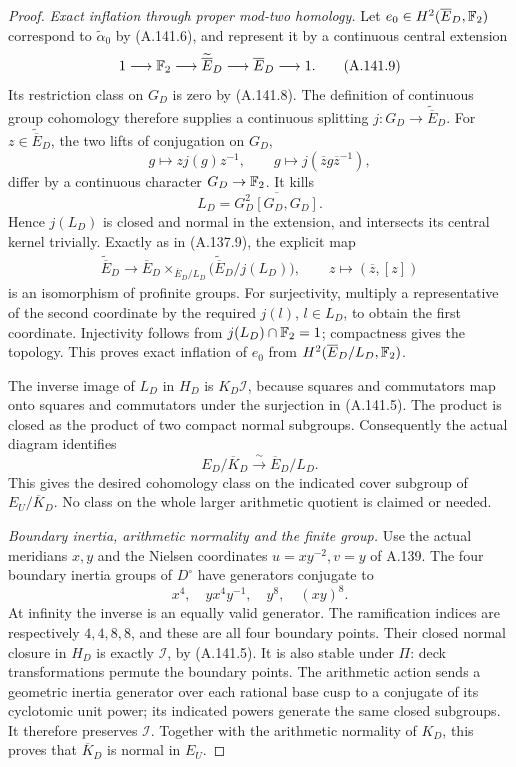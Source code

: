 \begin{proof}
\emph{Exact inflation through proper mod-two homology.}
Let \(e_0\in H^2(\overline E_D,\mathbb F_2)\) correspond to
\(\widetilde\alpha_0\) by (A.141.6), and represent it by a
continuous central extension
\[
 1\longrightarrow\mathbb F_2\longrightarrow
      \widetilde{\overline E}_D\longrightarrow
      \overline E_D\longrightarrow1.
\tag{A.141.9}
\]
Its restriction class on \(G_D\) is zero by (A.141.8).
The definition of continuous group cohomology therefore supplies
a continuous splitting \(j:G_D\to\widetilde{\overline E}_D\).
For \(z\in\widetilde{\overline E}_D\), the two lifts of conjugation
on \(G_D\),
\[
       g\longmapsto zj(g)z^{-1},\qquad
       g\longmapsto j(\overline z g\overline z^{-1}),
\tag{A.141.10}
\]
differ by a continuous character \(G_D\to\mathbb F_2\).
It kills
\[
                     L_D=\overline{G_D^2[G_D,G_D]}.
\tag{A.141.11}
\]
Hence \(j(L_D)\) is closed and normal in the extension, and
intersects its central kernel trivially.
Exactly as in (A.137.9), the explicit map
\[
 \begin{gathered}
 \widetilde{\overline E}_D
   \longrightarrow
   \overline E_D\mathop{\times}_{\overline E_D/L_D}
               \bigl(\widetilde{\overline E}_D/j(L_D)\bigr),
       \qquad z\longmapsto(\overline z,[z])
 \end{gathered}
\tag{A.141.12}
\]
is an isomorphism of profinite groups.
For surjectivity, multiply a representative of the second
coordinate by the required \(j(l)\), \(l\in L_D\), to obtain
the first coordinate.  Injectivity follows from
\(j(L_D)\cap\mathbb F_2=1\); compactness gives the topology.
This proves exact inflation of \(e_0\) from
\(H^2(\overline E_D/L_D,\mathbb F_2)\).

The inverse image of \(L_D\) in \(H_D\) is \(K_D\mathcal I\),
because squares and commutators map onto squares and commutators
under the surjection in (A.141.5).
The product is closed as the product of two compact normal
subgroups.  Consequently the actual diagram identifies
\[
        E_D/\overline K_D
            \xrightarrow{\ \sim\ }\overline E_D/L_D .
\tag{A.141.13}
\]
This gives the desired cohomology class on the indicated cover
subgroup of \(E_U/\overline K_D\).
No class on the whole larger arithmetic quotient is claimed or
needed.

\emph{Boundary inertia, arithmetic normality and the finite group.}
Use the actual meridians \(x,y\) and the Nielsen coordinates
\(u=xy^{-2},v=y\) of A.139.
The four boundary inertia groups of \(D^\circ\) have generators
conjugate to
\[
                   x^4,\quad yx^4y^{-1},\quad
                   y^8,\quad (xy)^8.
\tag{A.141.14}
\]
At infinity the inverse is an equally valid generator.
The ramification indices are respectively \(4,4,8,8\),
and these are all four boundary points.
Their closed normal closure in \(H_D\) is exactly
\(\mathcal I\), by (A.141.5).
It is also stable under \(\Pi\): deck transformations permute
the boundary points.
The arithmetic action sends a geometric inertia generator
over each rational base cusp to a conjugate of its cyclotomic
unit power; its indicated powers generate the same closed
subgroups.  It therefore preserves \(\mathcal I\).
Together with the arithmetic normality of \(K_D\), this proves
that \(\overline K_D\) is normal in \(E_U\).


\end{proof}

